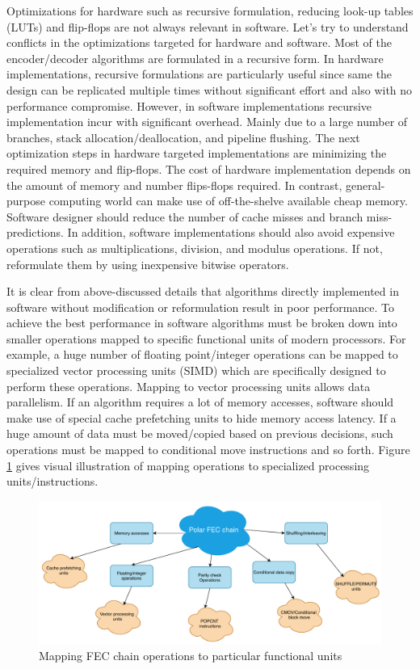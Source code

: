 Optimizations for hardware such as recursive formulation, reducing look-up tables (LUTs) and flip-flops are not always relevant in software. Let's try to understand conflicts in the optimizations targeted for hardware and software. Most of the encoder/decoder algorithms are formulated in a recursive form. In hardware implementations, recursive formulations are particularly useful since same the design can be replicated multiple times without significant effort and also with no performance compromise. However, in software implementations recursive implementation incur with significant overhead. Mainly due to a large number of branches, stack allocation/deallocation, and pipeline flushing. The next optimization steps in hardware targeted implementations are minimizing the required memory and flip-flops. The cost of hardware implementation depends on the amount of memory and number flips-flops required\cite{minimizeFPGAResource}. In contrast, general-purpose computing world can make use of off-the-shelve available cheap memory. Software designer should reduce the number of cache misses and branch miss-predictions\cite{cacheMiss}. In addition, software implementations should also avoid expensive operations such as multiplications, division, and modulus operations. If not, reformulate them by using inexpensive bitwise operators. \newline

It is clear from above-discussed details that algorithms directly implemented in software without modification or reformulation result in poor performance. To achieve the best performance in software algorithms must be broken down into smaller operations mapped to specific functional units of modern processors. For example, a huge number of floating point/integer operations can be mapped to specialized vector processing units (SIMD) which are specifically designed to perform these operations. Mapping to vector processing units allows data parallelism. If an algorithm requires a lot of memory accesses, software should make use of special cache prefetching units to hide memory access latency. If a huge amount of data must be moved/copied based on previous decisions, such operations must be mapped to conditional move instructions and so forth.  Figure \ref{fig:operationMapping} gives visual illustration of mapping operations to specialized processing units/instructions.

\begin{figure}[]
	\centering
	\includegraphics[width=1\textwidth]{./figures/operationMapping.pdf}
	\caption{Mapping FEC chain operations to particular functional units}
	\label{fig:operationMapping}
\end{figure}


